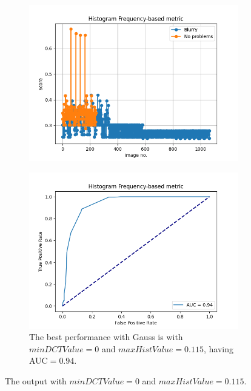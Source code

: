 \begin{figure}[H]
\begin{subfigure}[t]{0.48\textwidth}
        \label{fig:HF_roc_115}
    \end{subfigure}\hspace{1em}
    \begin{subfigure}[t]{0.48\textwidth}
        \includegraphics[width=\textwidth]{Figures/BlurredImages/tweakHF/gauss_min0_max0.115_output_basic.png}
        \caption{}
        \label{fig:HF_basic_gauss_115}
    \end{subfigure}\hspace{1em}
    \begin{subfigure}[t]{0.48\textwidth}
        \includegraphics[width=\textwidth]{Figures/BlurredImages/tweakHF/gauss_min0_max0.115_output_roc.png}
        \caption{The best performance with Gauss is with $minDCTValue=0$ and $maxHistValue=0.115$, having AUC$=0.94$.}
        \label{fig:HF_roc_gauss_115}
    \end{subfigure}
    \caption{The output with $minDCTValue=0$ and $maxHistValue=0.115$.}
    \label{fig:tweakHF}
\end{figure}
